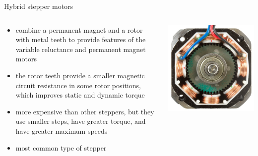 \documentclass[compress]{beamer}
\begin{document}
\begin{frame}{Hybrid stepper motors}

    \begin{columns}
        \begin{column}{0.6\linewidth}
            \begin{itemize}
                \item combine a permanent magnet and a
                    rotor with metal teeth to provide features of the variable
                    reluctance and permanent magnet motors 

                \item the rotor teeth provide a smaller magnetic circuit
                    resistance in some rotor positions, which improves static
                    and dynamic torque

                \item more expensive than other steppers, but they use smaller
                    steps, have greater torque, and have greater maximum speeds

                \item most common type of stepper
            \end{itemize}
        \end{column}
        \begin{column}{0.4\linewidth}

            \begin{center}
                \includegraphics[width=0.9\linewidth]{hybrid}
                \hspace{1em}


\end{center}
\end{column}
\end{columns}
\end{frame}
\end{document}
